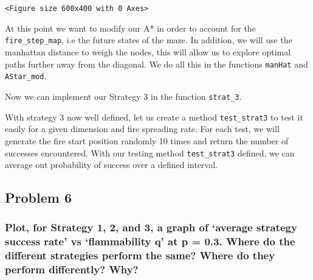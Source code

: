 \documentclass[11pt]{article}
\begin{document}
    \begin{center}
    \end{center}
    { \hspace*{\fill} \\}
    
    \begin{center}
    \end{center}
    { \hspace*{\fill} \\}
    
    
    \begin{Verbatim}[commandchars=\\\{\}]
<Figure size 600x400 with 0 Axes>
    \end{Verbatim}

    
    At this point we want to modify our A* in order to account for the
\texttt{fire\_step\_map}, i.e the future states of the maze. In
addition, we will use the manhattan distance to weigh the nodes, this
will allow us to explore optimal paths further away from the diagonal.
We do all this in the functions \texttt{manHat} and \texttt{AStar\_mod}.

    Now we can implement our Strategy 3 in the function \texttt{strat\_3}.

    With strategy 3 now well defined, let us create a method
\texttt{test\_strat3} to test it easily for a given dimension and fire
spreading rate. For each test, we will generate the fire start position
randomly 10 times and return the number of successes encountered. With
our testing method \texttt{test\_strat3} defined, we can average out
probability of success over a defined interval.

    \hypertarget{problem-6}{%
\subsection{Problem 6}\label{problem-6}}

    \hypertarget{plot-for-strategy-1-2-and-3-a-graph-of-average-strategy-success-rate-vs-flammability-q-at-p-0.3.-where-do-the-different-strategies-perform-the-same-where-do-they-perform-differently-why}{%
\subsubsection{Plot, for Strategy 1, 2, and 3, a graph of `average
strategy success rate' vs `flammability q' at p = 0.3. Where do the
different strategies perform the same? Where do they perform
differently?
Why?}\label{plot-for-strategy-1-2-and-3-a-graph-of-average-strategy-success-rate-vs-flammability-q-at-p-0.3.-where-do-the-different-strategies-perform-the-same-where-do-they-perform-differently-why}}
\end{document}
